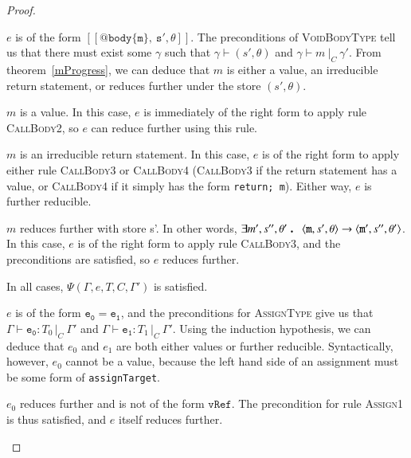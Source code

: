 \documentclass[12pt,a4paper,twoside,openright]{report}
\theoremstyle{definition}
\theoremstyle{dotless}
\newcommand{\typed}[2]{\Gamma{}\vdash\mathtt{#1}: #2\,|_C\:\Gamma'}
\newcommand{\transition}[6]{\langle{}\mathtt{#1},#2,#3\rangle{}\rightarrow{}\langle{}\mathtt{#4},#5,#6\rangle}
\newcommand{\indHypTwo}{\Psi(\Gamma, e, T, C, \Gamma')}
\newcommand\qdot{\mathbin{\scalebox{1.5}{.}}\enspace}
\begin{document}
\begin{proof}
\begin{case}[PropType]
  \end{case}

  \begin{case}[VoidBodyType]\label{bodytype}

	$e$ is of the form $\mathtt{[\![@body\{m\},\ s', \theta]\!]}$. The
	preconditions of \textsc{VoidBodyType} tell us that there must exist some
	$\gamma$ such that $\gamma \vdash(s', \theta)$ and $\gamma\vdash m\ |_C\
	\gamma'$. From theorem~\ref{mProgress}, we can deduce that $m$ is either
	a value, an irreducible return statement, or reduces further under the store $(s',
	\theta)$.

	\begin{subcase}
	  $m$ is a value.
	  In this case, $e$ is immediately of the right form to apply rule
	  \textsc{CallBody2}, so $e$ can reduce further using this rule.
	\end{subcase}

	\begin{subcase}
	  $m$ is an irreducible return statement.
	  In this case, $e$ is of the right form to apply either rule \textsc{CallBody3} or
	  \textsc{CallBody4} (\textsc{CallBody3} if the return statement has a
	  value, or \textsc{CallBody4} if it simply has the form \texttt{return; m}).
 	  Either way, $e$ is further reducible.
	\end{subcase}

	\begin{subcase}
	  $m$ reduces further with store s'.
	  In other words, $\exists m', s'', \theta'\qdot \transition{m}{s'}{\theta}{m'}{s''}{\theta'}$.
	  In this case, $e$ is of the right form to apply rule \textsc{CallBody3},
	  and the preconditions are satisfied, so $e$ reduces further. 
	\end{subcase}

	In all cases, $\indHypTwo$ is satisfied.

  \end{case}

  \begin{case}[AssignType]\label{assigntype}

	$e$ is of the form $\mathtt{e_0 = e_1}$, and the preconditions for \textsc{AssignType} give us that
	$\typed{e_0}{T_0}$ and $\typed{e_1}{T_1}$. Using the
	induction hypothesis, we can deduce that $e_0$ and $e_1$ are both either values
	or further reducible. Syntactically, however, $e_0$ cannot be a value, because the left
	hand side of an assignment must be some form of \texttt{assignTarget}.

	\begin{subcase}
	  $e_0$ reduces further and is not of the form $\mathtt{vRef}$. 
	  The precondition for rule \textsc{Assign1} is thus satisfied, and $e$
	  itself reduces further.
	\end{subcase}


\end{case}
\end{proof}
\end{document}
